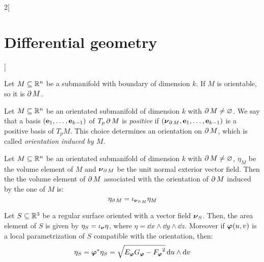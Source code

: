 \documentclass[../../../main_math.tex]{subfiles}
\begin{document}
\begin{multicols}{2}[\section{Differential geometry}]
\begin{definition}
  \end{definition}
  \begin{proposition}
    Let $M\subseteq\mathbb{R}^n$ be a submanifold with boundary of dimension $k$. If $M$ is orientable, so it is $\operatorname{\partial}{M}$.
  \end{proposition}
  \begin{definition}
    Let $M\subseteq\mathbb{R}^n$ be an orientated submanifold of dimension $k$ with $\operatorname{\partial}{M}\ne\varnothing$. We say that a basis $(\boldsymbol{\mathrm{e}}_1,\ldots,\boldsymbol{\mathrm{e}}_{k-1})$ of $T_p\operatorname{\partial}{M}$ is \emph{positive} if $(\boldsymbol{\mathrm{\nu}}_{\operatorname{\partial}{M}},\boldsymbol{\mathrm{e}}_1,\ldots,\boldsymbol{\mathrm{e}}_{k-1})$ is a positive basis of $T_pM$. This choice determines an orientation on $\operatorname{\partial}{M}$, which is called \emph{orientation induced by $M$}.
  \end{definition}
  \begin{proposition}
    Let $M\subseteq\mathbb{R}^n$ be an orientated submanifold of dimension $k$ with $\operatorname{\partial}{M}\ne\varnothing$, $\eta_M$ be the volume element of $M$ and $\boldsymbol{\mathrm{\nu}}_{\operatorname{\partial}{M}}$ be the unit normal exterior vector field. Then the the volume element of $\operatorname{\partial}{M}$ associated with the orientation of $\operatorname{\partial}{M}$ induced by the one of $M$ is: $$\eta_{\operatorname{\partial}{M}}=\iota_{\boldsymbol{\mathrm{\nu}}_{\operatorname{\partial}{M}}}\eta_M$$
  \end{proposition}
  \begin{proposition}
    Let $S\subseteq\mathbb{R}^3$ be a regular surface oriented with a vector field $\boldsymbol{\mathrm{\nu}}_S$. Then, the area element of $S$ is given by $\eta_S=\iota_{\boldsymbol{\mathrm{\nu}}}\eta$, where $\eta=\dd{x}\wedge\dd{y}\wedge\dd{z}$. Moreover if $\boldsymbol{\mathrm{\varphi}}(u,v)$ is a local parametrization of $S$ compatible with the orientation, then: $$\eta_S=\boldsymbol{\mathrm{\varphi}}^*\eta_S=\sqrt{E_{\boldsymbol{\mathrm{\varphi}}}G_{\boldsymbol{\mathrm{\varphi}}}-{F_{\boldsymbol{\mathrm{\varphi}}}}^2}\dd{u}\wedge\dd{v}$$
  \end{proposition}

\end{multicols}
\end{document}
